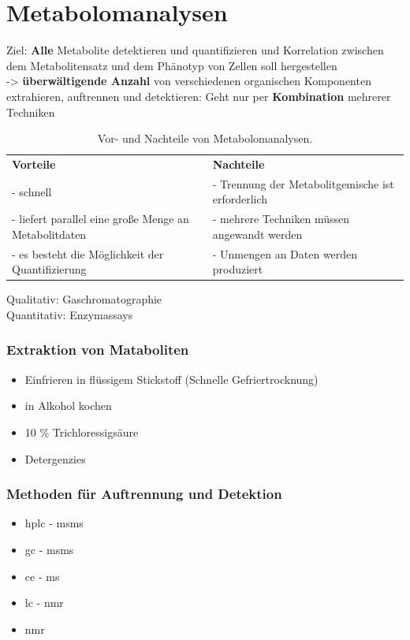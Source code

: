 \section{Metabolomanalysen}
Ziel: \textbf{Alle} Metabolite detektieren und quantifizieren und Korrelation zwischen dem Metabolitensatz und dem Phänotyp von Zellen soll hergestellen \\
-> \textbf{überwältigende Anzahl} von verschiedenen organischen Komponenten extrahieren, auftrennen und detektieren: Geht nur per \textbf{Kombination} mehrerer Techniken 
\begin{table}[H]
    \centering
    \begin{tabular}{p{8cm} p{8cm}}
        \textbf{Vorteile} & \textbf{Nachteile} \\
      - schnell & - Trennung der Metabolitgemische ist erforderlich \\
      - liefert parallel eine große Menge an Metabolitdaten & - mehrere Techniken müssen angewandt werden \\
      - es besteht die Möglichkeit der Quantifizierung & - Unmengen an Daten werden produziert
    \end{tabular}
    \caption{Vor- und Nachteile von Metabolomanalysen.}
    \label{tab:prokontrametabolomanalysen}
\end{table}
\begin{mechanism}[title=Wie kann man Metabolite qualitativ und quantitativ in verschiedenen Regionen untersuchen?]
Qualitativ: Gaschromatographie \\
Quantitativ: Enzymassays
\end{mechanism}
\subsubsection{Extraktion von Mataboliten} 

\begin{itemize}
    \item Einfrieren in flüssigem Stickstoff (Schnelle Gefriertrocknung)
    \item in Alkohol kochen
    \item 10 \% \gls{Trichloressigsäure}
    \item \glspl{Detergenzie}
\end{itemize}

\subsubsection{Methoden für Auftrennung und Detektion}
\begin{itemize}
    \item \gls{hplc} - \gls{msms}
    \item \gls{gc} - \gls{msms}
    \item \gls{ce} - \gls{ms}
    \item \gls{lc} - \gls{nmr}
    \item \gls{nmr}
\end{itemize}


